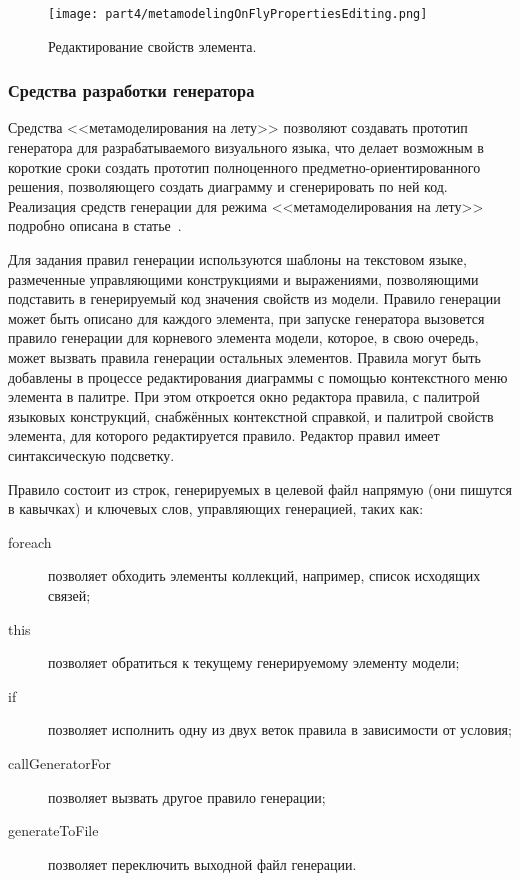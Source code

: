 \begin{figure} [ht]
	\begin{center}
		\texttt{[image: part4/metamodelingOnFlyPropertiesEditing.png]}
		\caption{Редактирование свойств элемента.}
		\label{image:metamodelingOnFlyPropertiesEditing}
	\end{center}
\end{figure}

\subsubsection{Средства разработки генератора}
Средства <<метамоделирования на лету>> позволяют создавать прототип генератора для
разрабатываемого визуального языка, что делает возможным в короткие сроки создать 
прототип полноценного предметно-ориентированного решения, позволяющего создать диаграмму
и сгенерировать по ней код. Реализация средств генерации для режима <<метамоделирования на лету>>
подробно описана в статье~\cite{tikhonova2015generation}.

Для задания правил генерации используются шаблоны на текстовом языке, размеченные 
управляющими конструкциями и выражениями, позволяющими подставить в генерируемый код
значения свойств из модели. Правило генерации может быть описано для каждого элемента,
при запуске генератора вызовется правило генерации для корневого элемента модели, которое,
в свою очередь, может вызвать правила генерации остальных элементов. Правила могут быть
добавлены в процессе редактирования диаграммы с помощью контекстного меню элемента
в палитре. При этом откроется окно редактора правила, с палитрой языковых конструкций,
снабжённых контекстной справкой, и палитрой свойств элемента, для которого редактируется правило.
Редактор правил имеет синтаксическую подсветку.

Правило состоит из строк, генерируемых в целевой файл напрямую (они пишутся в кавычках) 
и ключевых слов, управляющих генерацией, таких как:
\begin{description}
	\item[foreach] позволяет обходить элементы коллекций, например, список исходящих связей;
	\item[this] позволяет обратиться к текущему генерируемому элементу модели;
	\item[if] позволяет исполнить одну из двух веток правила в зависимости от условия;
	\item[callGeneratorFor] позволяет вызвать другое правило генерации;
	\item[generateToFile] позволяет переключить выходной файл генерации.
\end{description}

